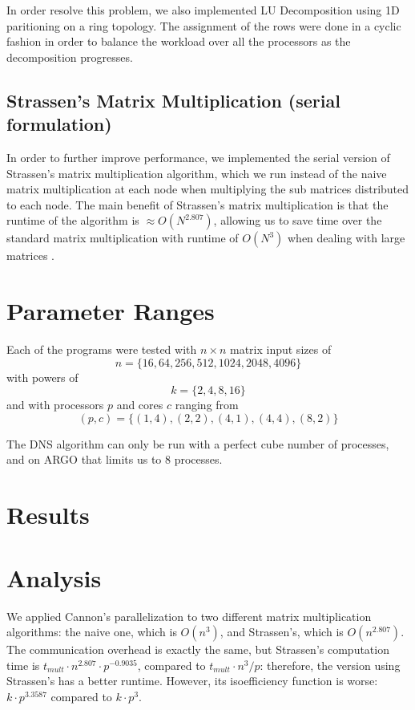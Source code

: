 \documentclass{article}
\begin{document}
In order resolve this problem, we also implemented LU Decomposition using 1D
paritioning on a ring topology.  The assignment of the rows were done in a
cyclic fashion in order to balance the workload over all the processors as the
decomposition progresses.

\subsection{Strassen's Matrix Multiplication (serial formulation)}

In order to further improve performance, we implemented the serial version of
Strassen's matrix multiplication algorithm, which we run instead of the naive
matrix multiplication at each node when multiplying the sub matrices distributed
to each node.  The main benefit of Strassen's matrix multiplication is that the
runtime of the algorithm is $\approx O(N^{2.807})$, allowing us to save time
over the standard matrix multiplication with runtime of $O(N^3)$ when dealing
with large matrices .

\section{Parameter Ranges}

Each of the programs were tested with $n \times n$ matrix input sizes of $$n =
\{ 16, 64, 256, 512, 1024, 2048, 4096 \}$$ with powers of $$k=\{ 2, 4, 8,
16 \}$$ and with processors $p$ and cores $c$ ranging from $$(p,c) = \{ (1,4),
(2,2), (4,1), (4,4), (8,2) \}$$

The DNS algorithm can only be run with a perfect cube number of processes, and
on ARGO that limits us to 8 processes.

\section{Results}



\section{Analysis}

We applied Cannon's parallelization to two different matrix multiplication algorithms: the naive one, which is $O(n^3)$, and Strassen's, which is $O(n^{2.807})$. The communication overhead is exactly the same, but Strassen's computation time is $t_{{mult}} \cdot n^{2.807} \cdot  p^{-0.9035}$, compared to $t_{mult} \cdot n^3 / p$: therefore, the version using Strassen's has a better runtime. However, its isoefficiency function is worse: $k \cdot p^{3.3587}$ compared to $k \cdot p^3$.
\end{document}
